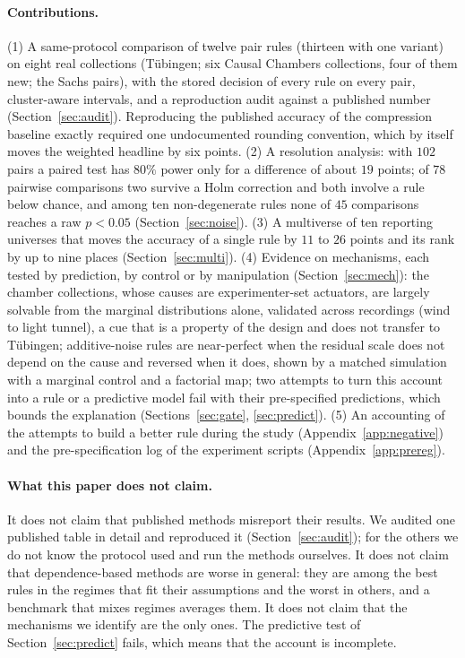 \paragraph{Contributions.} (1) A same-protocol comparison of twelve pair rules (thirteen with one variant) on eight real collections (T\"ubingen; six Causal Chambers collections, four of them new; the Sachs pairs), with the stored decision of every rule on every pair, cluster-aware intervals, and a reproduction audit against a published number (Section~\ref{sec:audit}). Reproducing the published accuracy of the compression baseline exactly required one undocumented rounding convention, which by itself moves the weighted headline by six points. (2) A resolution analysis: with $102$ pairs a paired test has $80\%$ power only for a difference of about $19$ points; of $78$ pairwise comparisons two survive a Holm correction and both involve a rule below chance, and among ten non-degenerate rules none of $45$ comparisons reaches a raw $p<0.05$ (Section~\ref{sec:noise}). (3) A multiverse of ten reporting universes that moves the accuracy of a single rule by $11$ to $26$ points and its rank by up to nine places (Section~\ref{sec:multi}). (4) Evidence on mechanisms, each tested by prediction, by control or by manipulation (Section~\ref{sec:mech}): the chamber collections, whose causes are experimenter-set actuators, are largely solvable from the marginal distributions alone, validated across recordings (wind to light tunnel), a cue that is a property of the design and does not transfer to T\"ubingen; additive-noise rules are near-perfect when the residual scale does not depend on the cause and reversed when it does, shown by a matched simulation with a marginal control and a factorial map; two attempts to turn this account into a rule or a predictive model fail with their pre-specified predictions, which bounds the explanation (Sections~\ref{sec:gate}, \ref{sec:predict}). (5) An accounting of the attempts to build a better rule during the study (Appendix~\ref{app:negative}) and the pre-specification log of the experiment scripts (Appendix~\ref{app:prereg}).

\paragraph{What this paper does not claim.} It does not claim that published methods misreport their results. We audited one published table in detail and reproduced it (Section~\ref{sec:audit}); for the others we do not know the protocol used and run the methods ourselves. It does not claim that dependence-based methods are worse in general: they are among the best rules in the regimes that fit their assumptions and the worst in others, and a benchmark that mixes regimes averages them. It does not claim that the mechanisms we identify are the only ones. The predictive test of Section~\ref{sec:predict} fails, which means that the account is incomplete.

